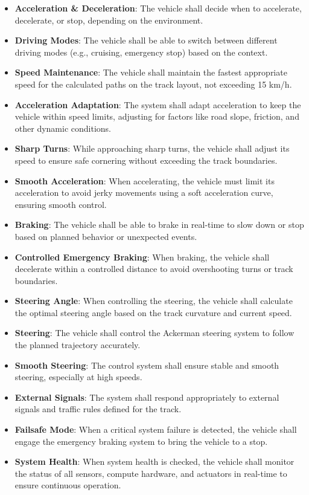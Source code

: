 \begin{itemize}
    \item \textbf{Acceleration \& Deceleration}: The vehicle shall decide when to accelerate, decelerate, or stop, depending on the environment.
    \item \textbf{Driving Modes}: The vehicle shall be able to switch between different driving modes (e.g., cruising, emergency stop) based on the context.
    \item \textbf{Speed Maintenance}: The vehicle shall maintain the fastest appropriate speed for the calculated paths on the track layout, not exceeding 15 km/h.
    \item \textbf{Acceleration Adaptation}: The system shall adapt acceleration to keep the vehicle within speed limits, adjusting for factors like road slope, friction, and other dynamic conditions.
    \item \textbf{Sharp Turns}: While approaching sharp turns, the vehicle shall adjust its speed to ensure safe cornering without exceeding the track boundaries.
    \item \textbf{Smooth Acceleration}: When accelerating, the vehicle must limit its acceleration to avoid jerky movements using a soft acceleration curve, ensuring smooth control.
    \item \textbf{Braking}: The vehicle shall be able to brake in real-time to slow down or stop based on planned behavior or unexpected events.
    \item \textbf{Controlled Emergency Braking}: When braking, the vehicle shall decelerate within a controlled distance to avoid overshooting turns or track boundaries.
    \item \textbf{Steering Angle}: When controlling the steering, the vehicle shall calculate the optimal steering angle based on the track curvature and current speed.
    \item \textbf{Steering}: The vehicle shall control the Ackerman steering system to follow the planned trajectory accurately.
    \item \textbf{Smooth Steering}: The control system shall ensure stable and smooth steering, especially at high speeds.
    \item \textbf{External Signals}: The system shall respond appropriately to external signals and traffic rules defined for the track.
    \item \textbf{Failsafe Mode}: When a critical system failure is detected, the vehicle shall engage the emergency braking system to bring the vehicle to a stop.
    \item \textbf{System Health}: When system health is checked, the vehicle shall monitor the status of all sensors, compute hardware, and actuators in real-time to ensure continuous operation.

\end{itemize}
